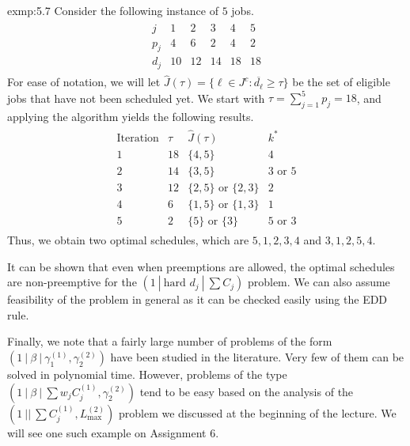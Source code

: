 \begin{exmp}{exmp:5.7}
    Consider the following instance of $5$ jobs. 
    \begin{align*}
        \begin{array}{c|ccccc}
            j & 1 & 2 & 3 & 4 & 5 \\ \hline 
            p_j & 4 & 6 & 2 & 4 & 2 \\ 
            d_j & 10 & 12 & 14 & 18 & 18
        \end{array}
    \end{align*}
    For ease of notation, we will let $\hat J(\tau) = \{\ell \in J^c : 
    \overline{d_\ell} \geq \tau\}$ be the set of eligible jobs that have 
    not been scheduled yet. We start with $\tau = \sum_{j=1}^5 p_j = 18$, 
    and applying the algorithm yields the following results. 
    \begin{align*}
        \begin{array}{c|c|c|c} 
            \text{Iteration} & \tau & \hat J(\tau) & k^* \\ \hline 
            1 & 18 & \{4, 5\} & 4 \\ 
            2 & 14 & \{3, 5\} & 3 \text{ or } 5 \\ 
            3 & 12 & \{2, 5\} \text{ or } \{2, 3\} & 2 \\ 
            4 & 6 & \{1, 5\} \text{ or } \{1, 3\} & 1 \\ 
            5 & 2 & \{5\} \text{ or } \{3\} & 5 \text{ or } 3            
        \end{array}
    \end{align*}
    Thus, we obtain two optimal schedules, which are $5, 1, 2, 3, 4$ and 
    $3, 1, 2, 5, 4$. 
\end{exmp}

It can be shown that even when preemptions are allowed, the optimal schedules 
are non-preemptive for the $(1~|~\text{hard } d_j~|~\sum C_j)$ problem. We can 
also assume feasibility of the problem in general as it can be checked easily 
using the EDD rule. 

Finally, we note that a fairly large number of problems of the form 
$(1~|~\beta~|~\gamma_1^{(1)}, \gamma_2^{(2)})$ have been studied in the 
literature. Very few of them can be solved in polynomial time. However, 
problems of the type $(1~|~\beta~|~\sum w_j C_j^{(1)}, \gamma_2^{(2)})$ 
tend to be easy based on the analysis of the $(1~||~\sum C_j^{(1)}, 
L_{\max}^{(2)})$ problem we discussed at the beginning of the lecture. 
We will see one such example on Assignment 6.

